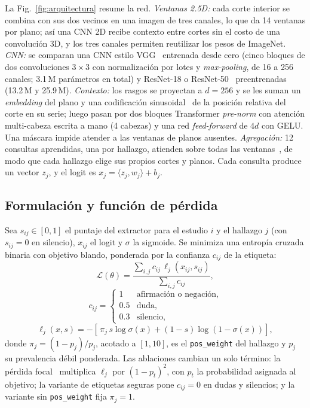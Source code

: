 \documentclass[conference]{IEEEtran}
\begin{document}
La Fig.~\ref{fig:arquitectura} resume la red.
\emph{Ventanas 2.5D:} cada corte interior se combina con sus dos vecinos en una imagen de tres canales, lo que da 14 ventanas por plano; así una CNN 2D recibe contexto entre cortes sin el costo de una convolución 3D, y los tres canales permiten reutilizar los pesos de ImageNet.
\emph{CNN:} se comparan una CNN estilo VGG~\cite{simonyan2015vgg} entrenada desde cero (cinco bloques de dos convoluciones $3\times3$ con normalización por lotes y \emph{max-pooling}, de 16 a 256 canales; 3.1\,M parámetros en total) y ResNet-18 o ResNet-50~\cite{he2016resnet} preentrenadas (13.2\,M y 25.9\,M).
\emph{Contexto:} los rasgos se proyectan a $d=256$ y se les suman un \emph{embedding} del plano y una codificación sinusoidal~\cite{vaswani2017attention} de la posición relativa del corte en su serie; luego pasan por dos bloques Transformer \emph{pre-norm} con atención multi-cabeza escrita a mano (4 cabezas) y una red \emph{feed-forward} de $4d$ con GELU.
Una máscara impide atender a las ventanas de planos ausentes.
\emph{Agregación:} 12 consultas aprendidas, una por hallazgo, atienden sobre todas las ventanas~\cite{ilse2018attention}, de modo que cada hallazgo elige sus propios cortes y planos.
Cada consulta produce un vector $z_j$, y el logit es $x_j=\langle z_j, w_j\rangle + b_j$.

\subsection{Formulación y función de pérdida}
\label{sec:perdida}

Sea $s_{ij}\in[0,1]$ el puntaje del extractor para el estudio $i$ y el hallazgo $j$ (con $s_{ij}=0$ en silencio), $x_{ij}$ el logit y $\sigma$ la sigmoide.
Se minimiza una entropía cruzada binaria con objetivo blando, ponderada por la confianza $c_{ij}$ de la etiqueta:
\begin{equation}
  \mathcal{L}(\theta) = \frac{\sum_{i,j} c_{ij}\,\ell_j(x_{ij}, s_{ij})}{\sum_{i,j} c_{ij}},
  \label{eq:perdida}
\end{equation}
\begin{equation}
  c_{ij} = \begin{cases} 1 & \text{afirmación o negación,} \\ 0.5 & \text{duda,} \\ 0.3 & \text{silencio,} \end{cases}
  \label{eq:confianza}
\end{equation}
\begin{equation}
  \ell_j(x, s) = -\left[\,\pi_j\, s \log\sigma(x) + (1-s)\log\left(1-\sigma(x)\right)\right],
  \label{eq:bce}
\end{equation}
donde $\pi_j=(1-p_j)/p_j$, acotado a $[1,10]$, es el \texttt{pos\_weight} del hallazgo y $p_j$ su prevalencia débil ponderada.
Las ablaciones cambian un solo término: la pérdida focal~\cite{lin2017focal} multiplica $\ell_j$ por $(1-p_t)^2$, con $p_t$ la probabilidad asignada al objetivo; la variante de etiquetas seguras pone $c_{ij}=0$ en dudas y silencios; y la variante sin \texttt{pos\_weight} fija $\pi_j=1$.
\end{document}
